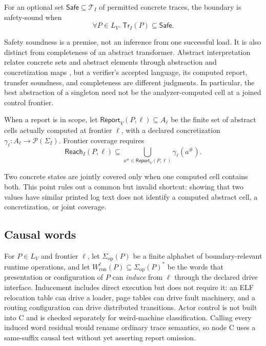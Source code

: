 \documentclass[conference]{IEEEtran}
\begin{document}
For an optional set $\mathsf{Safe}\subseteq\mathcal T_I$ of permitted concrete traces, the boundary is safety-sound when
\begin{equation}
\forall P\in L_V.\ \mathsf{Tr}_I(P)\subseteq\mathsf{Safe}.
\end{equation}

Safety soundness is a premise, not an inference from one successful load. It is also distinct from completeness of an abstract transformer. Abstract interpretation relates concrete sets and abstract elements through abstraction and concretization maps \cite{ref5}, but a verifier's accepted language, its computed report, transfer soundness, and completeness are different judgments. In particular, the best abstraction of a singleton need not be the analyzer-computed cell at a joined control frontier.

When a report is in scope, let $\mathsf{Report}_V(P,\ell)\subseteq A_\ell$ be the finite set of abstract cells actually computed at frontier $\ell$, with a declared concretization $\gamma_\ell:A_\ell\to\mathcal P(\Sigma_I)$. Frontier coverage requires
\begin{equation}
\mathsf{Reach}_I(P,\ell)
\subseteq
\bigcup_{a^\#\in\mathsf{Report}_V(P,\ell)}\gamma_\ell(a^\#).
\end{equation}

Two concrete states are jointly covered only when one computed cell contains both. This point rules out a common but invalid shortcut: showing that two values have similar printed log text does not identify a computed abstract cell, a concretization, or joint coverage.

\subsection{Causal words}

For $P\in L_V$ and frontier $\ell$, let $\Sigma_{\mathrm{op}}(P)$ be a finite alphabet of boundary-relevant runtime operations, and let $W^\ell_{\mathrm{run}}(P)\subseteq\Sigma_{\mathrm{op}}(P)^*$ be the words that presentation or configuration of $P$ can \emph{induce} from $\ell$ through the declared drive interface. Inducement includes direct execution but does not require it: an ELF relocation table can drive a loader, page tables can drive fault machinery, and a routing configuration can drive distributed transitions. Actor control is not built into C and is checked separately for weird-machine classification. Calling every induced word residual would rename ordinary trace semantics, so node C uses a same-suffix causal test without yet asserting report omission.
\end{document}
